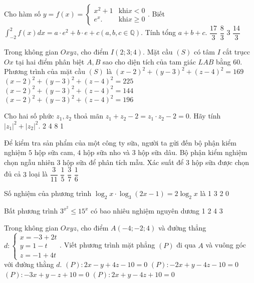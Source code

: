 \begin{ex}
 Cho hàm số $y=f(x)=\left\{\begin{array}{ll}x^{2}+1 & \text {khi} x<0 \\ e^{x}. & \text {khi} x \geq 0\end{array}.\right.$ Biết $\int_{-2}^{2} f(x) d x=a \cdot e^{2}+b \cdot e+c(a, b, c \in \mathbb{Q}).$ Tính tổng $a+b+c$.
\choice
{$\dfrac{17}{3}$}
{$\dfrac{8}{3}$}
{3}
{$\dfrac{14}{3}$}
\end{ex}

\begin{ex}
 Trong không gian $O x y z$, cho điểm $I(2; 3; 4)$. Mặt cầu $(S)$ có tâm $I$ cắt trụcc $O x$ tại hai điểm phân biệt $A, B$ sao cho diện tích của tam giác $L A B$ bằng 60. Phương trình của mặt cầu $(S)$ là
\choice
{$(x-2)^{2}+(y-3)^{2}+(z-4)^{2}=169$}
{$(x-2)^{2}+(y-3)^{2}+(z-4)^{2}=225$}
{$(x-2)^{2}+(y-3)^{2}+(z-4)^{2}=144$}
{$(x-2)^{2}+(y-3)^{2}+(z-4)^{2}=196$}
\end{ex}

\begin{ex}
 Cho hai số phức $z_{1}, z_{2}$ thoả mãn $z_{1}+z_{2}-2=z_{1} \cdot z_{2}-2=0$. Hãy tính $\left|z_{1}\right|^{2}+\left|z_{2}\right|^{2}$.
\choice
{2}
{4}
{8}
{1}
\end{ex}

\begin{ex}
Để kiểm tra sản phẩm của một công ty sữa, người ta gửi đến bộ phận kiểm nghiệm $ 5  $ hộp sữa cam, $ 4$ hộp sữa nho và $3$ hộp sữa dâu. Bộ phận kiểm nghiệm chọn ngẫu nhiên $3$ hộp sữa để phân tích mẫu. Xác suất để $3$ hộp sữa được chọn đủ cả $ 3$ loại là
\choice
{$\dfrac{3}{11}$}
{$\dfrac{1}{5}$}
{$\dfrac{3}{7}$}
{$\dfrac{1}{6}$}
\end{ex}

\begin{ex}
 Số nghiệm của phương trình $\log _{2} x \cdot \log _{3}(2 x-1)=2 \log _{2} x$ là
\choice
{1}
{3}
{2}
{0}
\end{ex}

\begin{ex}
 Bất phương trình $3^{x^{2}} \leq 15^{x}$ có bao nhiêu nghiệm nguyên dương
\choice
{1}
{2}
{4}
{3}
\end{ex}

\begin{ex}
 Trong không gian $O x y z$, cho điểm $A(-4;-2; 4)$ và đường thẳng $d: \left\{\begin{array}{l}x=-3+2 t \\ y=1-t \\ z=-1+4 t\end{array}\right.$. Viết phương trình mặt phẳng $(P)$ đi qua $A$ và vuông góc với đường thằng $d$.
\choice
{$(P): 2 x-y+4 z-10=0$}
{$(P):-2 x+y-4 z-10=0$}
{$(P):-3 x+y-z+10=0$}
{$(P): 2 x+y-4 z+10=0$}
\end{ex}

